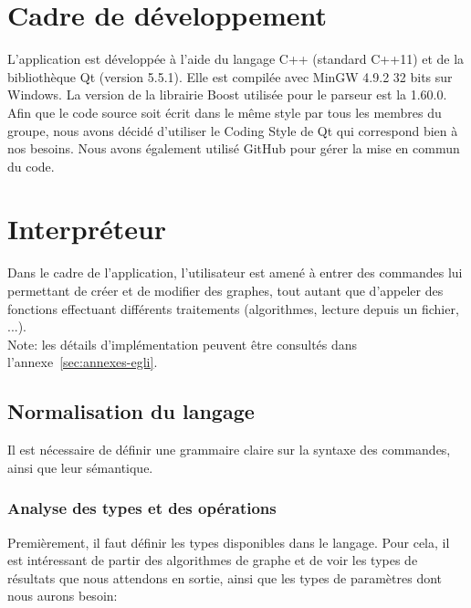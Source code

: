 \documentclass[french]{article}
\begin{document}
	\section{Cadre de développement} 
		L'application est développée à l'aide du langage C++ (standard C++11) et de la bibliothèque Qt (version 5.5.1). Elle est compilée avec MinGW 4.9.2 32 bits sur Windows. La version de la librairie Boost utilisée pour le parseur est la 1.60.0. Afin que le code source soit écrit dans le même style par tous les membres du groupe, nous avons décidé d'utiliser le Coding Style de Qt \cite{qtStyle} qui correspond bien à nos besoins. Nous avons également utilisé GitHub pour gérer la mise en commun du code.
			
	\section{Interpréteur} %
		Dans le cadre de l'application, l'utilisateur est amené à entrer des commandes lui permettant de créer et de modifier des graphes, tout autant que d'appeler des fonctions effectuant différents traitements (algorithmes, lecture depuis un fichier, ...).\\
		
		Note: les détails d'implémentation peuvent être consultés dans l'annexe~\ref{sec:annexes-egli}.
	
		\subsection{Normalisation du langage} 
			Il est nécessaire de définir une grammaire claire sur la syntaxe des commandes, ainsi que leur sémantique.
			
			\subsubsection{Analyse des types et des opérations} 
			\label{subsubsec:analyse-des-types-et-des-operations}
				Premièrement, il faut définir les types disponibles dans le langage. Pour cela, il est intéressant de partir des algorithmes de graphe et de voir les types de résultats que nous attendons en sortie, ainsi que les types de paramètres dont nous aurons besoin:
			
\end{document}

